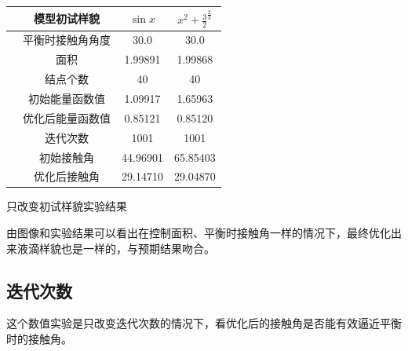 \documentclass[12pt,oneside,a4paper]{article}
\begin{document}
\begin{center}
\renewcommand\arraystretch{3}
\begin{tabular}{|c|c|c|}
\hline 
\rule[-1ex]{0pt}{2.5ex}　模型初试样貌 & $\sin x$ & $x^2+\frac{3}{2}^{\frac{2}{3}}$ \\ 
\hline 
\rule[-1ex]{0pt}{2.5ex}　平衡时接触角角度 & 30.0 & 30.0 \\ 
\hline 
\rule[-1ex]{0pt}{2.5ex}　面积 & 1.99891 & 1.99868 \\ 
\hline 
\rule[-1ex]{0pt}{2.5ex}　结点个数 & 40 & 40 \\ 
\hline 
\rule[-1ex]{0pt}{2.5ex}　初始能量函数值 & 1.09917 & 1.65963 \\ 
\hline 
\rule[-1ex]{0pt}{2.5ex}　优化后能量函数值 & 0.85121 & 0.85120 \\ 
\hline 
\rule[-1ex]{0pt}{2.5ex}　迭代次数 & 1001 & 1001 \\ 
\hline 
\rule[-1ex]{0pt}{2.5ex}　初始接触角 & 44.96901 & 65.85403 \\ 
\hline 
\rule[-1ex]{0pt}{2.5ex}　优化后接触角 & 29.14710 & 29.04870 \\ 
\hline 
\end{tabular} 
\centerline{只改变初试样貌实验结果}
\end{center}

由图像和实验结果可以看出在控制面积、平衡时接触角一样的情况下，最终优化出来液滴样貌也是一样的，与预期结果吻合。

\newpage

\subsection{迭代次数}
这个数值实验是只改变迭代次数的情况下，看优化后的接触角是否能有效逼近平衡时的接触角。
\end{document}
